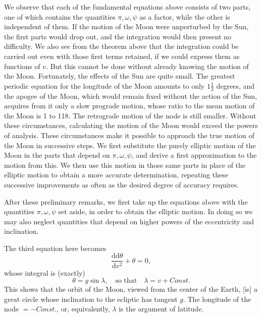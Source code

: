 \par\noindent\hspace*{\parindent}We observe that each of the fundamental equations above consists of two
parts, one of which contains the quantities \(\pi,\omega,\psi\) as a factor,
while the other is independent of them. If the motion of the Moon
were unperturbed by the Sun, the first parts would drop out, and the
integration would then present no difficulty. We also see from the theorem above
that the integration could be carried out even with those first terms retained,
if we could express them as functions of \(v\). But this cannot be done
without already knowing the motion of the Moon.
Fortunately, the effects of the Sun are quite small.
The greatest periodic equation for the longitude of the Moon
amounts to only \(1\tfrac13\) degrees, and the apogee of the Moon, which
would remain fixed without the action of the Sun, acquires from it
only a slow prograde motion, whose ratio to the mean motion of the
Moon is 1 to 118. The retrograde motion of the node is still smaller.
Without these circumstances, calculating the motion
of the Moon would exceed the powers of analysis. These circumstances make it possible
to approach the true motion of the Moon in successive steps. We
first substitute the purely elliptic motion of the Moon in the parts that depend on \(\pi,\omega,\psi\),
and derive a first approximation to the motion from this.
We then use this motion in those same parts in place of the elliptic motion
to obtain a more accurate determination, repeating these successive
improvements as often as the desired degree of accuracy
requires.

\par\noindent\hspace*{\parindent}After these preliminary remarks, we first take up the equations above
with the quantities \(\pi,\omega,\psi\) set aside, in order to
obtain the elliptic motion. In doing so we may also neglect quantities
that depend on higher powers of the eccentricity and
inclination.

\par\noindent\hspace*{\parindent}The third equation here becomes
\[
\frac{\mathrm{dd}\theta}{\mathrm{d}v^2}+\theta=0,
\]
\noindent whose integral is (exactly)
\[
\theta=g\sin\lambda,\quad\text{so that}\quad\lambda=v+\mathit{Const.}
\]
\noindent This shows that the orbit of the Moon, viewed from the center of the Earth,
[is] a great circle whose inclination to the ecliptic has
tangent \(g\). The longitude of the node \(=-\mathit{Const.}\), or, equivalently, \(\lambda\)
is the argument of latitude\HistoricalNoteEight{But reckoned along the ecliptic,
not along the orbit of the Moon.]}.

